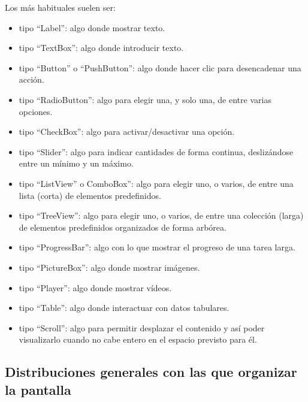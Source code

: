 \documentclass[spanish,12pt,a4paper,final,oneside]{book}
\begin{document}
Los más habituales suelen ser:
\begin{itemize}
\item tipo ``Label'': algo donde mostrar texto.
\item tipo ``TextBox'': algo donde introducir texto.
\item tipo ``Button'' o ``PushButton'': algo donde hacer clic para desencadenar una acción.
\item tipo ``RadioButton'': algo para elegir una, y solo una, de entre varias opciones.
\item tipo ``CheckBox'': algo para activar/desactivar una opción.
\item tipo ``Slider'': algo para indicar cantidades de forma continua, deslizándose entre un mínimo y un máximo.
\item tipo ``ListView'' o ComboBox'': algo para elegir uno, o varios, de entre una lista (corta) de elementos predefinidos.
\item tipo ``TreeView'': algo para elegir uno, o varios, de entre una colección (larga) de elementos predefinidos organizados de forma arbórea.
\item tipo ``ProgressBar'': algo con lo que mostrar el progreso de una tarea larga.
\item tipo ``PictureBox'': algo donde mostrar imágenes.
\item tipo ``Player'': algo donde mostrar vídeos.
\item tipo ``Table'': algo donde interactuar con datos tabulares.
\item tipo ``Scroll'': algo para permitir desplazar el contenido y así poder visualizarlo cuando no cabe entero en el espacio previsto para él.
\end{itemize}

\subsection{Distribuciones generales con las que organizar la pantalla}
\end{document}
